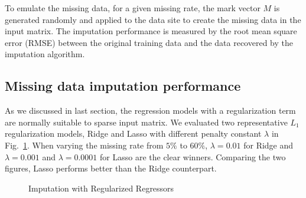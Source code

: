 To emulate the missing data, for a given missing rate, the mark vector $M$ is generated randomly and applied to the data site to create the 
missing data in the input matrix. The imputation performance is measured by the root mean square error (RMSE) between the original training data and the data recovered by the imputation algorithm. 


\subsection{Missing data imputation performance}
\label{subsec:im}
As we discussed in last section, the regression models with a regularization term are normally suitable to sparse input matrix.
We evaluated two representative $L_1$ regularization models, Ridge and Lasso with different penalty constant $\lambda$ in Fig.~\ref{fig:rmse:regu}.
When varying the missing rate from $5\%$ to $60\%$, $\lambda = 0.01$ for Ridge and $\lambda = 0.001$ and $\lambda = 0.0001$ for Lasso are the clear 
winners. Comparing the two figures, Lasso performs better than the Ridge counterpart.

  \begin{figure}[!ht]
    \hfill
    \caption{Imputation with Regularized Regressors}
    \label{fig:rmse:regu}
  \end{figure}

